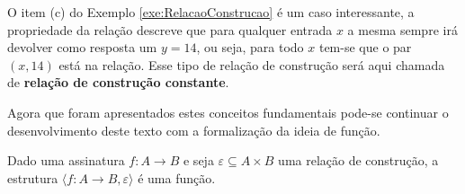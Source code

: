 \begin{remark}
	O item (c) do Exemplo \ref{exe:RelacaoConstrucao} é um caso interessante, a propriedade da relação descreve que para qualquer entrada $x$ a mesma sempre irá devolver como resposta um $y = 14$, ou seja, para todo $x$ tem-se que o par $(x, 14)$ está na relação. Esse tipo de relação de construção será aqui chamada de \textbf{relação de construção constante}.    
\end{remark}

Agora que foram apresentados estes conceitos fundamentais pode-se continuar o desenvolvimento deste texto com a formalização da ideia de função.

\begin{definition}[Função]
	Dado uma assinatura $f: A \rightarrow B$ e seja $\varepsilon \subseteq A \times B$ uma relação de construção, a estrutura $\langle f: A \rightarrow B, \varepsilon \rangle$ é uma função.
\end{definition}

